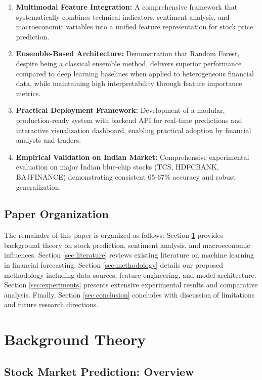 \documentclass[conference]{IEEEtran}
\begin{document}
\begin{enumerate}
\item \textbf{Multimodal Feature Integration:} A comprehensive framework that systematically combines technical indicators, sentiment analysis, and macroeconomic variables into a unified feature representation for stock price prediction.

\item \textbf{Ensemble-Based Architecture:} Demonstration that Random Forest, despite being a classical ensemble method, delivers superior performance compared to deep learning baselines when applied to heterogeneous financial data, while maintaining high interpretability through feature importance metrics.

\item \textbf{Practical Deployment Framework:} Development of a modular, production-ready system with backend API for real-time predictions and interactive visualization dashboard, enabling practical adoption by financial analysts and traders.

\item \textbf{Empirical Validation on Indian Market:} Comprehensive experimental evaluation on major Indian blue-chip stocks (TCS, HDFCBANK, BAJFINANCE) demonstrating consistent 65-67\% accuracy and robust generalization.
\end{enumerate}

\subsection{Paper Organization}

The remainder of this paper is organized as follows: Section \ref{sec:background} provides background theory on stock prediction, sentiment analysis, and macroeconomic influences. Section \ref{sec:literature} reviews existing literature on machine learning in financial forecasting. Section \ref{sec:methodology} details our proposed methodology including data sources, feature engineering, and model architecture. Section \ref{sec:experiments} presents extensive experimental results and comparative analysis. Finally, Section \ref{sec:conclusion} concludes with discussion of limitations and future research directions.

\section{Background Theory}
\label{sec:background}

\subsection{Stock Market Prediction: Overview}
\end{document}

